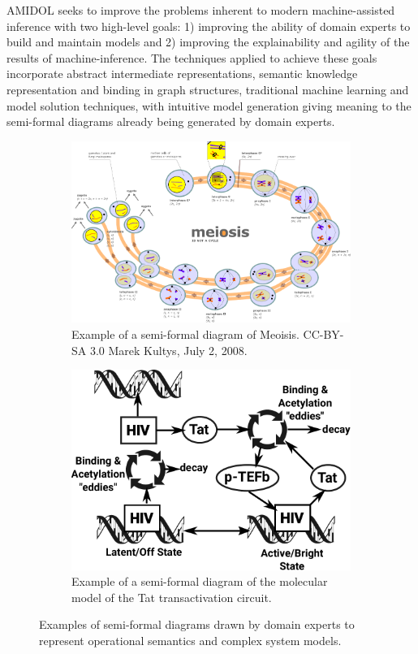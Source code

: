 \documentclass[11pt]{article}
\newcommand{\amidol}{\textsc{AMIDOL}}
\begin{document}
\amidol{} seeks to improve the problems inherent to modern machine-assisted inference with two high-level goals: 1) improving the ability of domain experts to build and maintain models and 2) improving the explainability and agility of the results of machine-inference.  The techniques applied to achieve these goals incorporate abstract intermediate representations, semantic knowledge representation and binding in graph structures, traditional machine learning and model solution techniques, with intuitive model generation giving meaning to the semi-formal diagrams already being generated by domain experts.

\begin{figure}
  \centering
  \begin{subfigure}[b]{0.48\textwidth}
    \includegraphics[width=\textwidth]{figs/Diagram_of_meiosis.pdf}
    \caption{Example of a semi-formal diagram of Meoisis. CC-BY-SA 3.0 Marek Kultys, July 2, 2008.}
    \label{Fig:Meiosis}
  \end{subfigure}
  \begin{subfigure}[b]{0.48\textwidth}
    \includegraphics[width=\textwidth]{figs/HIV-Tat-figure.pdf}
    \caption{Example of a semi-formal diagram of the molecular model of the Tat transactivation circuit.}
    \label{Fig:HIV-Tat}
  \end{subfigure}
  \caption{Examples of semi-formal diagrams drawn by domain experts to represent operational semantics and complex
  system models.}
  \label{Fig:Semi-formal}
\end{figure}
\end{document}
